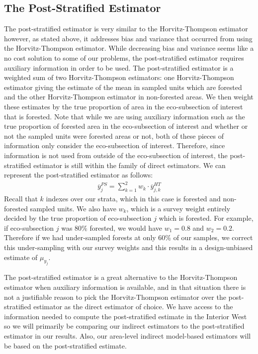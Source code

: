 \documentclass[12pt,twoside]{reedthesis}
\begin{document}
\hypertarget{the-post-stratified-estimator}{%
\subsection{The Post-Stratified Estimator}\label{the-post-stratified-estimator}}

The post-stratified estimator is very similar to the Horvitz-Thompson estimator however, as stated above, it addresses bias and variance that occurred from using the Horvitz-Thompson estimator. While decreasing bias and variance seems like a no cost solution to some of our problems, the post-stratified estimator requires auxiliary information in order to be used. The post-stratified estimator is a weighted sum of two Horvitz-Thompson estimators: one Horvitz-Thompson estimator giving the estimate of the mean in sampled units which are forested and the other Horvitz-Thompson estimator in non-forested areas. We then weight these estimates by the true proportion of area in the eco-subsection of interest that is forested. Note that while we are using auxiliary information such as the true proportion of forested area in the eco-subsection of interest and whether or not the sampled units were forested areas or not, both of these pieces of information only consider the eco-subsection of interest. Therefore, since information is not used from outside of the eco-subsection of interest, the post-stratified estimator is still within the family of direct estimators. We can represent the post-stratified estimator as follows:
\begin{align}
\overline y_j^{PS} = \sum_{k=1}^{2} w_k \cdot \overline y_{j,k}^{HT}
\end{align}
Recall that \(k\) indexes over our strata, which in this case is forested and non-forested sampled units. We also have \(w_k\), which is a survey weight entirely decided by the true proportion of eco-subsection \(j\) which is forested. For example, if eco-subsection \(j\) was 80\% forested, we would have \(w_1 = 0.8\) and \(w_2 = 0.2\). Therefore if we had under-sampled forests at only 60\% of our samples, we correct this under-sampling with our survey weights and this results in a design-unbiased estimate of \(\mu_{y_j}\).

The post-stratified estimator is a great alternative to the Horvitz-Thompson estimator when auxiliary information is available, and in that situation there is not a justifiable reason to pick the Horvitz-Thompson estimator over the post-stratified estimator as the direct estimator of choice. We have access to the information needed to compute the post-stratified estimate in the Interior West so we will primarily be comparing our indirect estimators to the post-stratified estimator in our results. Also, our area-level indirect model-based estimators will be based on the post-stratified estimate.
\end{document}
